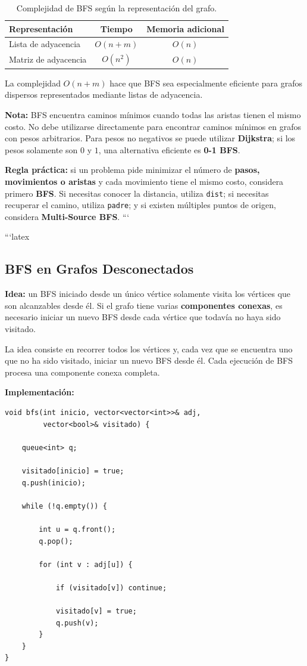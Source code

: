 \documentclass[10pt,a4paper,twocolumn]{article}
\begin{document}
\begin{table}[H]
\raggedright
\scriptsize
\setlength{\tabcolsep}{3pt}
\renewcommand{\arraystretch}{1.1}
\begin{tabular}{|l|c|c|}
\hline
\textbf{Representación} &
\textbf{Tiempo} &
\textbf{Memoria adicional} \\
\hline
Lista de adyacencia &
$O(n+m)$ &
$O(n)$ \\
\hline
Matriz de adyacencia &
$O(n^2)$ &
$O(n)$ \\
\hline
\end{tabular}
\caption{Complejidad de BFS según la representación del grafo.}
\end{table}

La complejidad $O(n+m)$ hace que BFS sea especialmente eficiente
para grafos dispersos representados mediante listas de adyacencia.

\textbf{Nota:} BFS encuentra caminos mínimos cuando todas las aristas
tienen el mismo costo. No debe utilizarse directamente para encontrar
caminos mínimos en grafos con pesos arbitrarios. Para pesos no
negativos se puede utilizar \textbf{Dijkstra}; si los pesos solamente
son $0$ y $1$, una alternativa eficiente es \textbf{0-1 BFS}.

\textbf{Regla práctica:} si un problema pide minimizar el número de
\textbf{pasos, movimientos o aristas} y cada movimiento tiene el mismo
costo, considera primero \textbf{BFS}. Si necesitas conocer la
distancia, utiliza \texttt{dist}; si necesitas recuperar el camino,
utiliza \texttt{padre}; y si existen múltiples puntos de origen,
considera \textbf{Multi-Source BFS}.
```


```latex
\subsection{BFS en Grafos Desconectados}

\textbf{Idea:} un BFS iniciado desde un único vértice solamente visita
los vértices que son alcanzables desde él. Si el grafo tiene varias
\textbf{componentes conexas}, es necesario iniciar un nuevo BFS desde
cada vértice que todavía no haya sido visitado.

La idea consiste en recorrer todos los vértices y, cada vez que se
encuentra uno que no ha sido visitado, iniciar un nuevo BFS desde él.
Cada ejecución de BFS procesa una componente conexa completa.

\textbf{Implementación:}

\begin{lstlisting}[style=cpp]
void bfs(int inicio, vector<vector<int>>& adj,
         vector<bool>& visitado) {

    queue<int> q;

    visitado[inicio] = true;
    q.push(inicio);

    while (!q.empty()) {

        int u = q.front();
        q.pop();

        for (int v : adj[u]) {

            if (visitado[v]) continue;

            visitado[v] = true;
            q.push(v);
        }
    }
}
\end{lstlisting}
\end{document}
